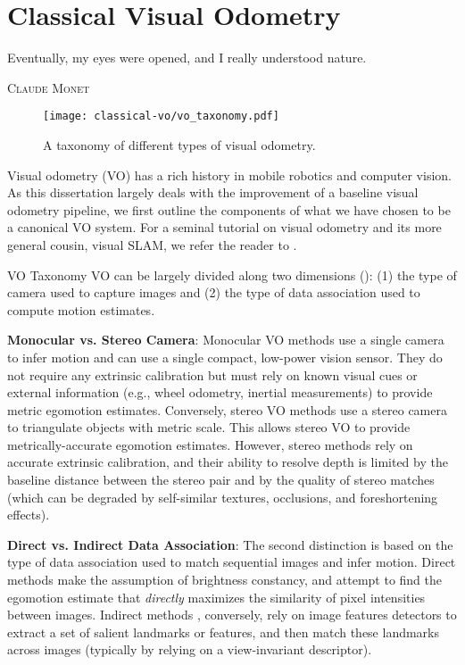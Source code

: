 \chapter{Classical Visual Odometry}
\label{ch:vo}
\epigraph{Eventually, my eyes were opened, and I really understood nature.}{\textsc{Claude Monet}}

\begin{figure}[h!]
\begin{center}
		\texttt{[image: classical-vo/vo\_taxonomy.pdf]}
		\caption{A taxonomy of different types of visual odometry.}
  	\label{fig:vo_taxonomy}
\end{center}
\end{figure}


Visual odometry (VO) has a rich history in mobile robotics and computer vision. As this dissertation largely deals with the improvement of a baseline visual odometry pipeline, we first outline the components of what we have chosen to be a canonical VO system. For a seminal tutorial on visual odometry and its more general cousin, visual SLAM, we refer the reader to \cite{Scaramuzza2011-qr,Cadena2016-ds}.
\newpage
\begin{remark}{VO Taxonomy}
VO can be largely divided along two dimensions (): (1) the type of camera used to capture images and (2) the type of data association used to compute motion estimates. 

\textbf{Monocular vs. Stereo Camera}:
 Monocular VO methods \citep{engel_direct_2018,Tsotsos2015} use a single camera to infer motion and can use a single compact, low-power vision sensor. They do not require any extrinsic calibration but must rely on known visual cues or external information (e.g., wheel odometry, inertial measurements) to provide metric egomotion estimates. Conversely, stereo VO methods \citep{engel_direct_2018, Leutenegger2015-fk, Cvisic2015-mt} use a stereo camera to triangulate objects with metric scale. This allows stereo VO to provide metrically-accurate egomotion estimates. However, stereo methods rely on accurate extrinsic calibration, and their ability to resolve depth is limited by the baseline distance between the stereo pair and by the quality of stereo matches (which can be degraded by self-similar textures, occlusions, and foreshortening effects). 

\textbf{Direct vs. Indirect Data Association}:
The second distinction is based on the type of data association used to match sequential images and infer motion. Direct methods \citep{engel_direct_2018,wang_stereo_2017} make the assumption of brightness constancy, and attempt to find the egomotion estimate that \textit{directly} maximizes the similarity of pixel intensities between images. Indirect methods \citep{Leutenegger2015-fk,Cvisic2015-mt}, conversely, rely on image features detectors to extract a set of salient landmarks or features, and then match these landmarks across images (typically by relying on a view-invariant descriptor).	
\end{remark}



